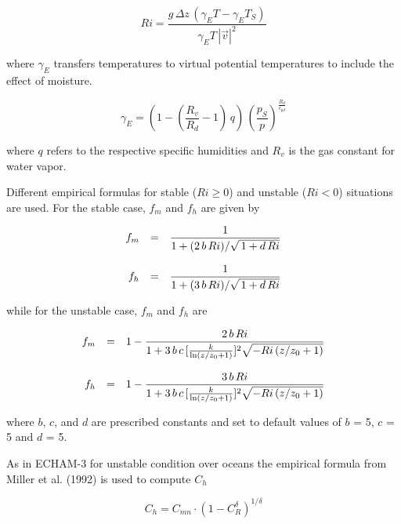 \begin{equation}
Ri=\frac{g\, \Delta z \,(\gamma_E T - \gamma_E T_S)}{\gamma_E T
\, |\vec{v}|^2} 
\end{equation}

where $\gamma_E$ transfers temperatures to virtual
potential temperatures to include the effect of moisture.

\begin{equation}\label{gammaE}
\gamma_E =  \left(1- \left(\frac{R_v}{R_d}-1\right)\, q
\right)
\,\left(\frac{p_S}{p}\right)^{\frac{R_d}{c_{pd}}}
\end{equation}
 

where $q$ refers to the respective specific humidities and
$R_v$ is the gas constant for  water
vapor.   

Different empirical formulas for stable ($Ri \ge 0$)
and
unstable ($Ri < 0$) situations are used. For the stable
case, $f_m$ and $f_h$ are given by 

\begin{equation}\label{fmfh1}
\begin{array}{rcl}
\displaystyle  f_m & = &\displaystyle  \frac{1}{1+(2\,b\,Ri) /\sqrt{\,1+ d\,
Ri}}
\\
&& \\
\displaystyle f_h & = &\displaystyle  \frac{1}{1+(3\,b\,Ri) /\sqrt{\,1+ d\,
Ri}}
\end{array}
\end{equation}

while for the unstable case,  $f_m$ and $f_h$ are

\begin{equation}\label{fmfh2}
\begin{array}{rcl}
\displaystyle f_m & = & \displaystyle 1- \frac{2\,b\,Ri}{1+3\,b\,c\, [
\frac{k}{\ln(z/z_0+1)}]^2\sqrt{-Ri\, (z/z_0+1)}} \\
&& \\
\displaystyle f_h & = &\displaystyle  1- \frac{3\,b\,Ri}{1+3\,b\,c\, [
\frac{k}{\ln(z/z_0+1)}]^2\sqrt{-Ri\, (z/z_0+1)}}
\end{array}
\end{equation}

where $b$, $c$, and $d$ are prescribed constants and
set
to
default values of  $b$ = 5,  $c$ = 5 and $d$ = 5.

As in ECHAM-3 for unstable condition over oceans the empirical formula from Miller et al. (1992) is used to compute $C_h$

\begin{equation}\label{miller}
C_h=C_{mn} \cdot (1-C_R^{\delta})^{1/\delta}
\end{equation}


